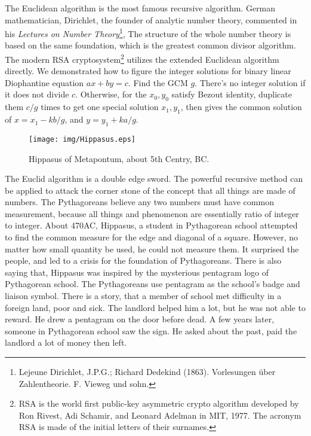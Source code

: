 \documentclass{article}
\begin{document}
The Euclidean algorithm is the most famous recursive algorithm. German mathematician, Dirichlet, the founder of analytic number theory, commented in his {\em Lectures on Number Theory}\footnote{Lejeune Dirichlet, J.P.G.; Richard Dedekind (1863). Vorlesungen über Zahlentheorie. F. Vieweg und sohn.}, The structure of the whole number theory is based on the same foundation, which is the greatest common divisor algorithm. The modern RSA cryptosystem\footnote{RSA is the world first public-key asymmetric crypto algorithm developed by Ron Rivest, Adi Schamir, and Leonard Adelman in MIT, 1977. The acronym RSA is made of the initial letters of their surnames.} utilizes the extended Euclidean algorithm directly. We demonstrated how to figure the integer solutions for binary linear Diophantine equation $ax + by = c$. Find the GCM $g$. There's no integer solution if it does not divide $c$. Otherwise, for the $x_0, y_0$ satisfy Bezout identity, duplicate them $c/g$ times to get one special solution $x_1, y_1$, then gives the common solution of $x = x_1 - k b / g$, and $y = y_1 + k a / g$.

\begin{wrapfigure}{R}{0.4\textwidth}
 \centering
 \texttt{[image: img/Hippasus.eps]}
 \captionsetup{labelformat=empty}
 \caption{Hippasus of Metapontum, about 5th Centry, BC.}
 \label{fig:Hippasus}
\end{wrapfigure}

The Euclid algorithm is a double edge sword. The powerful recursive method can be applied to attack the corner stone of the concept that all things are made of numbers. The Pythagoreans believe any two numbers must have common measurement, because all things and phenomenon are essentially ratio of integer to integer. About 470AC, Hippasus, a student in Pythagorean school attempted to find the common measure for the edge and diagonal of a square. However, no matter how small quantity be used, he could not measure them. It surprised the people, and led to a crisis for the foundation of Pythagoreans. There is also saying that, Hippasus was inspired by the mysterious pentagram logo of Pythagorean school. The Pythagoreans use pentagram as the school's badge and liaison symbol. There is a story, that a member of school met difficulty in a foreign land, poor and sick. The landlord helped him a lot, but he was not able to reward. He drew a pentagram on the door before dead. A few years later, someone in Pythagorean school saw the sign. He asked about the past, paid the landlord a lot of money then left\cite{HanXueTao16}.
\end{document}
